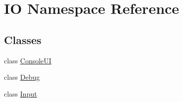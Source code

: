 \hypertarget{namespace_i_o}{}\section{IO Namespace Reference}
\label{namespace_i_o}
\subsection*{Classes}
\begin{DoxyCompactItemize}
\item 
class \mbox{\hyperlink{class_i_o_1_1_console_u_i}{Console\+UI}}
\item 
class \mbox{\hyperlink{class_i_o_1_1_debug}{Debug}}
\item 
class \mbox{\hyperlink{class_i_o_1_1_input}{Input}}
\end{DoxyCompactItemize}
